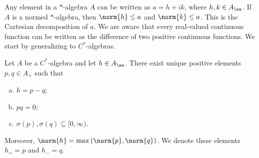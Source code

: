 \documentclass[10pt]{mypackage}
\begin{document}
Any element in a $\ast$-algebra $A$ can be written as $a = h + ik$, where $h,k\in A_{\sa}$. If $A$ is a normed $\ast$-algebra, then $\norm{h}\leq a$ and $\norm{k}\leq a$. This is the Cartesian decomposition of $a$. We are aware that every real-valued continuous function can be written as the difference of two positive continuous functions. We start by generalizing to $C^{\ast}$-algebras.
\begin{proposition}
  Let $A$ be a $C^{\ast}$-algebra and let $h\in A_{\sa}$. There exist unique positive elements $p,q\in A_{+}$ such that
  \begin{enumerate}[(a)]
    \item $h = p-q$;
    \item $pq = 0$;
    \item $\sigma(p),\sigma(q)\subseteq [0,\infty)$.
  \end{enumerate}
  Moreover, $\norm{h} = \max\left(\norm{p},\norm{q}\right)$. We denote these elements $h_{=} = p$ and $h_{-} = q$.
\end{proposition}
\end{document}
